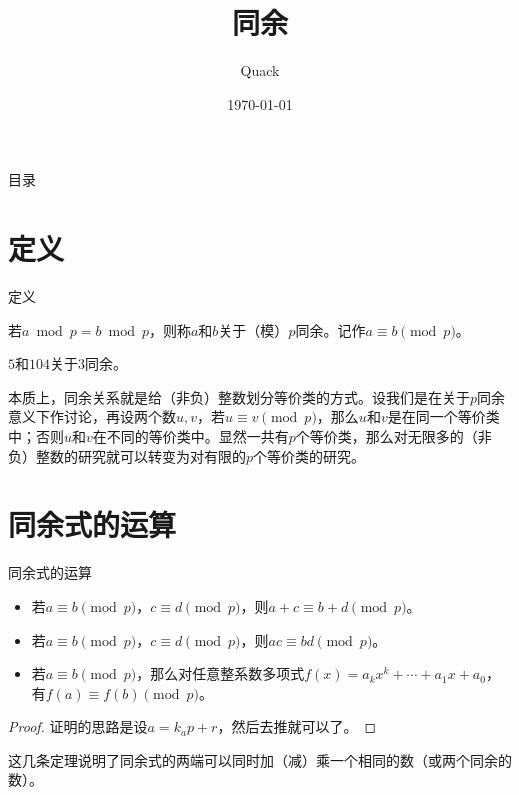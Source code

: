 \documentclass{ctexbeamer}        %
\begin{document}
%
\title{同余}
\author{Quack}
\date{\today}
\frame{\titlepage}

\begin{frame}{目录}         %
  \tableofcontents[hideallsubsections]
\end{frame}

\section{定义}

\begin{frame}{定义}

\begin{definition}[同余]
    若$a \bmod p = b \bmod p$，则称$a$和$b$关于（模）$p$同余。记作$a \equiv b \pmod p$。
\end{definition}

\begin{example}
    $5$和$104$关于$3$同余。
\end{example}

本质上，同余关系就是给（非负）整数划分等价类的方式。设我们是在关于$p$同余意义下作讨论，再设两个数$u,v$，若$u \equiv v \pmod p$，那么$u$和$v$是在同一个等价类中；否则$u$和$v$在不同的等价类中。显然一共有$p$个等价类，那么对无限多的（非负）整数的研究就可以转变为对有限的$p$个等价类的研究。

\end{frame}


\section{同余式的运算}

\begin{frame}{同余式的运算}
\begin{theorem}[加乘运算]
    \begin{itemize}
		\item 若$a \equiv b \pmod p$，$c \equiv d \pmod p$，则$a+c \equiv b+d \pmod p$。
		\item 若$a \equiv b \pmod p$，$c \equiv d \pmod p$，则$ac \equiv bd \pmod p$。
		\item 若$a \equiv b \pmod p$，那么对任意整系数多项式$f(x)=a_kx^k+\cdots+a_1x+a_0$，有$f(a) \equiv f(b) \pmod p$。
	\end{itemize}
\end{theorem}
\begin{proof}
    证明的思路是设$a=k_ap+r$，然后去推就可以了。
\end{proof}
这几条定理说明了同余式的两端可以同时加（减）乘一个相同的数（或两个同余的数）。
\end{frame}
\end{document}
